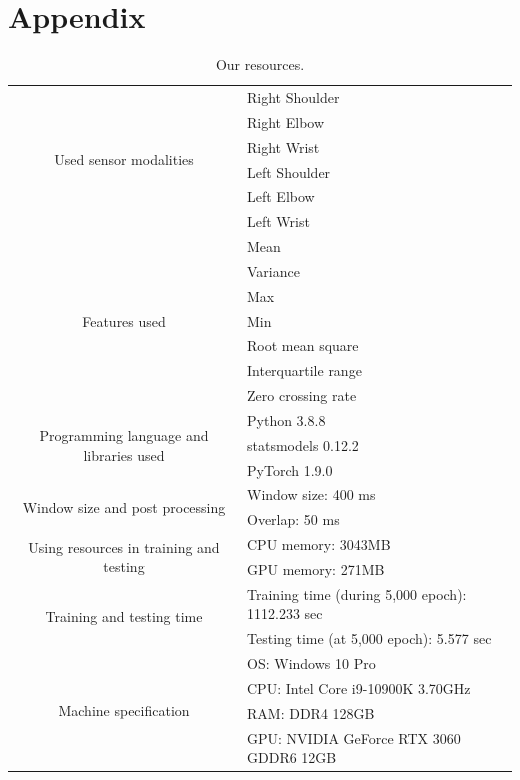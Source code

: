 \documentclass[graybox]{svmult}
\begin{document}





\section*{Appendix}

\begin{table}[h]
    \centering
    \caption{Our resources.}
    \begin{tabular}{c|l}\hline
    \multirow{6}{*}{Used sensor modalities} & Right Shoulder \\
    & Right Elbow \\
    & Right Wrist \\
    & Left Shoulder \\
    & Left Elbow \\
    & Left Wrist \\ \hline
    \multirow{7}{*}{Features used} & Mean \\
    & Variance \\
    & Max \\
    & Min \\
    & Root mean square \\
    & Interquartile range \\
    & Zero crossing rate \\ \hline
    \multirow{3}{*}{Programming language and libraries used} & Python 3.8.8 \\
    & statsmodels 0.12.2 \\
    & PyTorch 1.9.0 \\ \hline
    \multirow{2}{*}{Window size and post processing} & Window size: 400 ms \\
    & Overlap: 50 ms \\ \hline
    \multirow{2}{*}{Using resources in training and testing} & CPU memory: 3043MB \\
    & GPU memory: 271MB \\ \hline
    \multirow{2}{*}{Training and testing time} & Training time (during 5,000 epoch): 1112.233 sec \\
    & Testing time (at 5,000 epoch): 5.577 sec \\ \hline
    \multirow{4}{*}{Machine specification} & OS: Windows 10 Pro \\
    & CPU: Intel Core i9-10900K 3.70GHz \\
    & RAM: DDR4 128GB \\
    & GPU: NVIDIA GeForce RTX 3060 GDDR6 12GB \\ \hline
    \end{tabular}
\end{table}
\end{document}
